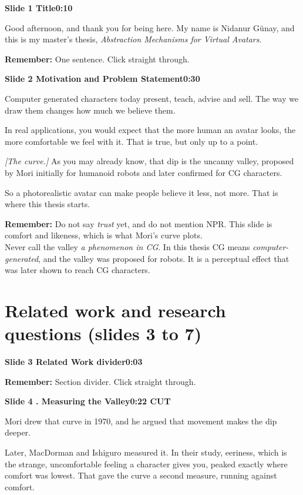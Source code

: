 \documentclass[11pt,a4paper]{article}
\newcommand{\slidehead}[3]{%
  \needspace{5\baselineskip}
  \vspace{0.9em}
  \noindent\colorbox{knblue}{\parbox{0.978\textwidth}{\vspace{1pt}\color{white}\textbf{Slide #1 \quad #2}\hfill\textbf{#3}\vspace{1pt}}}
  \vspace{0.35em}\par}
\newcommand{\remind}[1]{%
  \vspace{0.15em}
  \noindent\colorbox{knlight}{\parbox{0.972\textwidth}{\small\color{knblue}\textbf{Remember:} #1}}
  \vspace{0.2em}\par}
\newcommand{\pointto}[1]{{\color{knaccent}\textit{[#1]}}}
\begin{document}
\slidehead{1}{Title}{0:10}

Good afternoon, and thank you for being here. My name is Nidanur Günay, and this is my master's thesis, \emph{Abstraction Mechanisms for Virtual Avatars}.

\remind{One sentence. Click straight through.}

\slidehead{2}{Motivation and Problem Statement}{0:30}

Computer generated characters today present, teach, advise and sell. The way we draw them changes how much we believe them.

In real applications, you would expect that the more human an avatar looks, the more comfortable we feel with it. That is true, but only up to a point.

\pointto{The curve.} As you may already know, that dip is the uncanny valley, proposed by Mori initially for humanoid robots and later confirmed for CG characters.

So a photorealistic avatar can make people believe it less, not more. That is where this thesis starts.

\remind{Do not say \emph{trust} yet, and do not mention NPR. This slide is comfort and likeness, which is what Mori's curve plots.\\[0.4em] Never call the valley \emph{a phenomenon in CG}. In this thesis CG means \emph{computer-generated}, and the valley was proposed for robots. It is a perceptual effect that was later shown to reach CG characters.}

\section*{\color{knblue}Related work and research questions (slides 3 to 7)}

\slidehead{3}{Related Work divider}{0:03}

\remind{Section divider. Click straight through.}

\slidehead{4}{1. Measuring the Valley}{0:22 \quad CUT}

Mori drew that curve in 1970, and he argued that movement makes the dip deeper.

Later, MacDorman and Ishiguro measured it. In their study, eeriness, which is the strange, uncomfortable feeling a character gives you, peaked exactly where comfort was lowest. That gave the curve a second measure, running against comfort.
\end{document}
